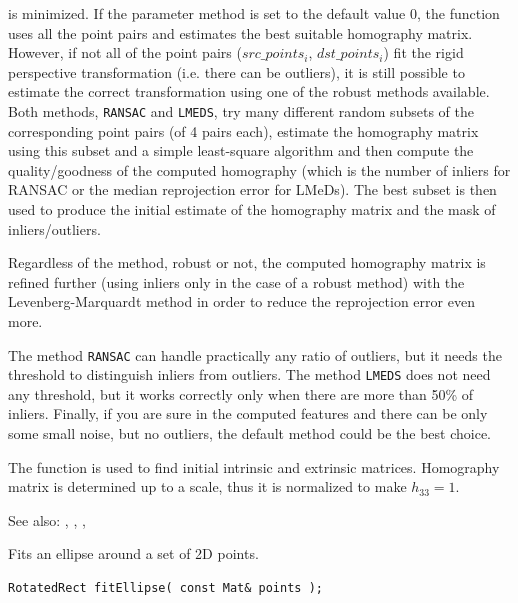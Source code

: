 \begin{description}
is minimized. If the parameter method is set to the default value 0, the function
uses all the point pairs and estimates the best suitable homography
matrix. However, if not all of the point pairs ($src\_points_i$,
$dst\_points_i$) fit the rigid perspective transformation (i.e. there
can be outliers), it is still possible to estimate the correct
transformation using one of the robust methods available. Both
methods, \texttt{RANSAC} and \texttt{LMEDS}, try many different random subsets
of the corresponding point pairs (of 4 pairs each), estimate
the homography matrix using this subset and a simple least-square
algorithm and then compute the quality/goodness of the computed homography
(which is the number of inliers for RANSAC or the median reprojection
error for LMeDs). The best subset is then used to produce the initial
estimate of the homography matrix and the mask of inliers/outliers.

Regardless of the method, robust or not, the computed homography
matrix is refined further (using inliers only in the case of a robust
method) with the Levenberg-Marquardt method in order to reduce the
reprojection error even more.

The method \texttt{RANSAC} can handle practically any ratio of outliers,
but it needs the threshold to distinguish inliers from outliers.
The method \texttt{LMEDS} does not need any threshold, but it works
correctly only when there are more than 50\% of inliers. Finally,
if you are sure in the computed features and there can be only some
small noise, but no outliers, the default method could be the best
choice.

The function is used to find initial intrinsic and extrinsic matrices.
Homography matrix is determined up to a scale, thus it is normalized
to make $h_{33} =1$.

See also: , , ,


\label{fitEllipse}
Fits an ellipse around a set of 2D points.

\begin{lstlisting}
RotatedRect fitEllipse( const Mat& points );
\end{lstlisting}
\begin{description}
\end{description}


\end{description}
